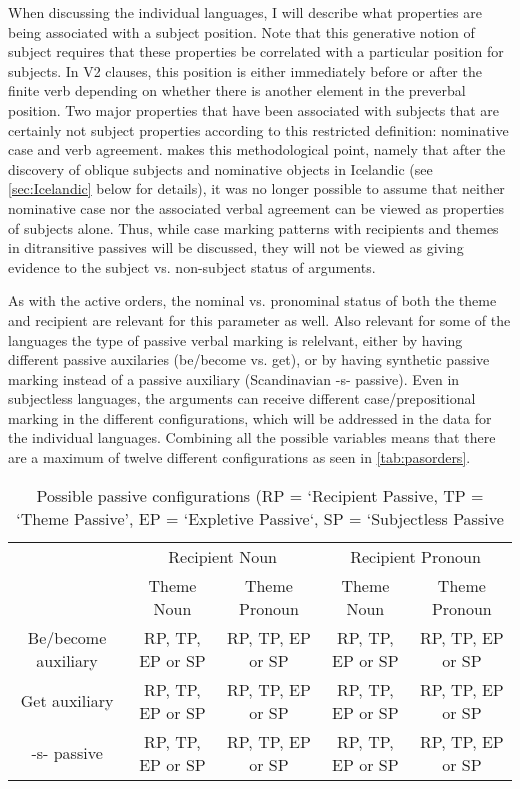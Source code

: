 When discussing the individual languages, I will describe what properties are being associated with a subject position. Note that this generative notion of subject requires that these properties be correlated with a particular position for subjects. In V2 clauses, this position is either immediately before or after the finite verb depending on whether there is another element in the preverbal position. Two major properties that have been associated with subjects that are certainly not subject properties according to this restricted definition: nominative case and verb agreement. \cite{Bardal.2000} makes this methodological point, namely that after the discovery of oblique subjects and nominative objects in Icelandic (see \autoref{sec:Icelandic} below for details), it was no longer possible to assume that neither nominative case nor the associated verbal agreement can be viewed as properties of subjects alone. Thus, while case marking patterns with recipients and themes in ditransitive passives will be discussed, they will not be viewed as giving evidence to the subject vs. non-subject status of arguments.

As with the active orders, the nominal vs. pronominal status of both the theme and recipient are relevant for this parameter as well. Also relevant for some of the languages the type of passive verbal marking is relelvant, either by having different passive auxilaries (be/become vs. get), or by having synthetic passive marking instead of a passive auxiliary (Scandinavian -s- passive). Even in subjectless languages, the arguments can receive different case/prepositional marking in the different configurations, which will be addressed in the data for the individual languages. Combining all the possible variables means that there are a maximum of twelve different configurations as seen in \autoref{tab:pasorders}. 

\begin{table}[h!]
\begin{tabular}{ccccc}
& \multicolumn{2}{c}{Recipient Noun} & \multicolumn{2}{c}{Recipient Pronoun}\\
& Theme Noun & Theme Pronoun & Theme Noun & Theme Pronoun\\
Be/become auxiliary & RP, TP, EP or SP & RP, TP, EP or SP & RP, TP, EP or SP & RP, TP, EP or SP\\
Get auxiliary & RP, TP, EP or SP & RP, TP, EP or SP & RP, TP, EP or SP & RP, TP, EP or SP\\
-s- passive & RP, TP, EP or SP & RP, TP, EP or SP & RP, TP, EP or SP & RP, TP, EP or SP\\
\end{tabular}
\caption{Possible passive configurations (RP = `Recipient Passive, TP = `Theme Passive', EP = `Expletive Passive`, SP = `Subjectless Passive }
\label{tab:activeorders}
\end{table}

